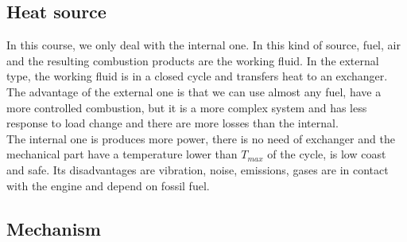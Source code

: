 	\subsection{Heat source}
		In this course, we only deal with the internal one. In this kind of source, fuel, air and the resulting combustion products are the working fluid. In the external type, the working fluid is in a closed cycle and transfers heat to an exchanger. The advantage of the external one is that we can use almost any fuel, have a more controlled combustion, but it is a more complex system and has less response to load change and there are more losses than the internal.   \\
		
		The internal one is produces more power, there is no need of exchanger and the mechanical part have a temperature lower than $T_{max}$ of the cycle, is low coast and safe. Its disadvantages are vibration, noise, emissions, gases are in contact with the engine and depend on fossil fuel. 
		
	\subsection{Mechanism}
		
